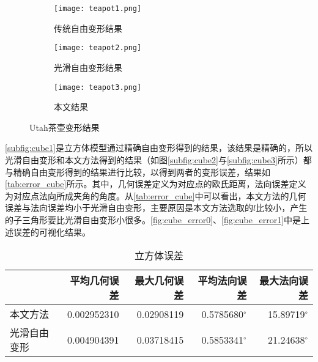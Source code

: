 \begin{figure}[htbp]
	\centering
	\begin{subfigure}[b]{.3\textwidth}
		\centering
		\texttt{[image: teapot1.png]}
		\caption{传统自由变形结果}\label{subfig:teapot1}
	\end{subfigure}
	\begin{subfigure}[b]{.3\textwidth}
		\centering
		\texttt{[image: teapot2.png]}
		\caption{光滑自由变形结果}\label{subfig:teapot2}
	\end{subfigure}
	\begin{subfigure}[b]{.3\textwidth}
		\centering
		\texttt{[image: teapot3.png]}
		\caption{本文结果}\label{subfig:teapot3}
	\end{subfigure}
	\caption{Utah茶壶变形结果}\label{fig:teapot_result}
\end{figure}

\autoref{subfig:cube1}是立方体模型通过精确自由变形得到的结果，该结果是精确的，所以光滑自由变形和本文方法得到的结果（如图\autoref{subfig:cube2}与\autoref{subfig:cube3}所示）都与精确自由变形得到的结果进行比较，以得到两者的变形误差，结果如\autoref{tab:error_cube}所示。其中，几何误差定义为对应点的欧氏距离，法向误差定义为对应点法向所成夹角的角度。从\autoref{tab:error_cube}中可以看出，本文方法的几何误差与法向误差均小于光滑自由变形，主要原因是本文方法选取的$l$比较小，产生的子三角形要比光滑自由变形小很多。\autoref{fig:cube_error0}、\autoref{fig:cube_error1}中是上述误差的可视化结果。

\begin{table}[htbp]
    \centering
    \begin{tabular}{lrrrr}
    \toprule
                    & 平均几何误差 & 最大几何误差 & 平均法向误差 & 最大法向误差 \\
    \midrule
        本文方法    & \num{0.002952310} & \num{0.02908119} & \num[scientific-notation=false]{0.5785680}$^\circ$ & \num[scientific-notation=false]{15.89719}$^\circ$ \\
        光滑自由变形& \num{0.004904391} & \num{0.03718415} & \num[scientific-notation=false]{0.5853341}$^\circ$ & \num[scientific-notation=false]{21.24638}$^\circ$ \\
    \bottomrule
    \end{tabular}
    \caption{立方体误差} \label{tab:error_cube}
\end{table}

